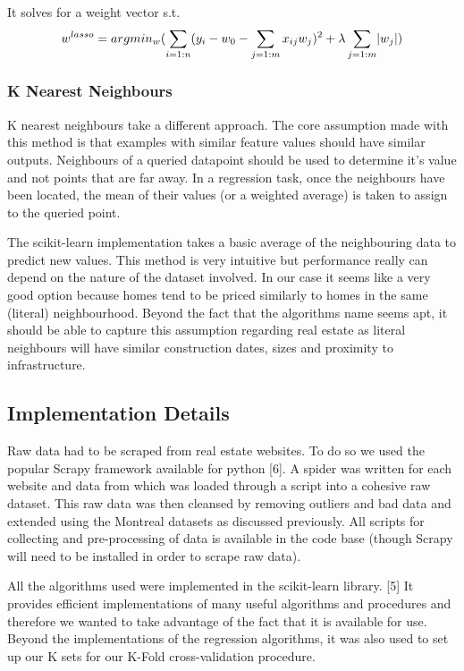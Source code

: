 \documentclass{acm_proc_article-sp}
\DeclarePairedDelimiter{\abs}{\lvert}{\rvert}
\begin{document}
	It solves for a weight vector s.t. \\
	\[ w^{lasso} = argmin_{w}(\sum_{i=1:n}(y_{i} - w_{0} - \sum_{j=1:m}x_{ij}w_{j})^{2} + \lambda\sum_{j=1:m}\abs{w_{j}}) \]
	
	
\subsubsection{K Nearest Neighbours}
	K nearest neighbours take a different approach. The core assumption made with this method is that examples with similar feature values should have similar outputs. Neighbours of a queried datapoint should be used to determine it's value and not points that are far away. In a regression task, once the neighbours have been located, the mean of their values (or a weighted average) is taken to assign to the queried point.
	
	The scikit-learn implementation takes a basic average of the neighbouring data to predict new values. This method is very intuitive but performance really can depend on the nature of the dataset involved. In our case it seems like a very good option because homes tend to be priced similarly to homes in the same (literal) neighbourhood. Beyond the fact that the algorithms name seems apt, it should be able to capture this assumption regarding real estate as literal neighbours will have similar construction dates, sizes and proximity to infrastructure.

\subsection{Implementation Details}
	Raw data had to be scraped from real estate websites. To do so we used the popular Scrapy framework available for python [6]. A spider was written for each website and data from which was loaded through a script into a cohesive raw dataset. This raw data was then cleansed by removing outliers and bad data and extended using the Montreal datasets as discussed previously. All scripts for collecting and pre-processing of data is available in the code base (though Scrapy will need to be installed in order to scrape raw data).
	
	All the algorithms used were implemented in the scikit-learn library. [5] It provides efficient implementations of many useful algorithms and procedures and therefore we wanted to take advantage of the fact that it is available for use. Beyond the implementations of the regression algorithms, it was also used to set up our K sets for our K-Fold cross-validation procedure. 
\end{document}
